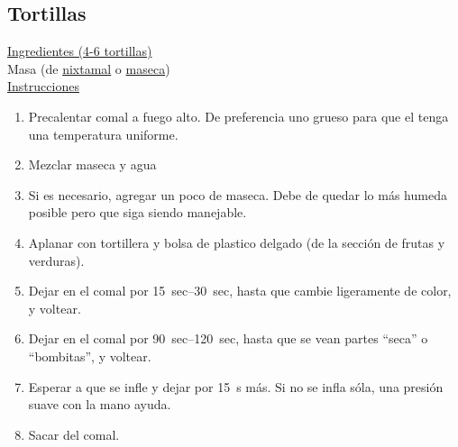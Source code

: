 \subsection{Tortillas}

\underline{Ingredientes (4-6 tortillas)}\\
Masa (de \hyperref[receta:masa-maiz]{nixtamal} o \hyperref[receta:masa-maseca]{maseca})\\

\underline{Instrucciones}
\begin{enumerate}
\item Precalentar comal a fuego alto. De preferencia uno grueso para que el tenga una temperatura uniforme.
\item Mezclar maseca y agua
\item Si es necesario, agregar un poco de maseca. Debe de quedar lo más humeda posible pero que siga siendo manejable.
\item Aplanar con tortillera y bolsa de plastico delgado (de la sección de frutas y verduras).
\item Dejar en el comal por \SIrange{15}{30}{sec}, hasta que cambie ligeramente de color, y voltear.
\item Dejar en el comal por \SIrange{90}{120}{sec}, hasta que se vean partes ``seca'' o ``bombitas'', y voltear.
\item Esperar a que se infle y dejar por \SI{15}{s} más. Si no se infla sóla, una presión suave con la mano ayuda.
\item Sacar del comal.
\end{enumerate}

